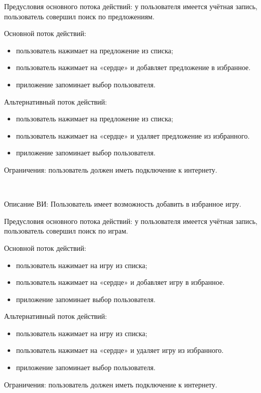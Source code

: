 Предусловия основного потока действий: у пользователя имеется учётная запись, пользователь совершил поиск по предложениям.
 
Основной поток действий:
\begin{itemize}
   \item пользователь нажимает на предложение из списка;
   \item пользователь нажимает на «сердце» и добавляет предложение в избранное.
   \item приложение запоминает выбор пользователя.
\end{itemize}

Альтернативный поток действий:
\begin{itemize}
   \item пользователь нажимает на предложение из списка;
   \item пользователь нажимает на «сердце» и удаляет предложение из избранного.
   \item приложение запоминает выбор пользователя.
\end{itemize}

Ограничения: пользователь должен иметь подключение к интернету.

~\par
\label{use:favoritegames}
Описание ВИ: Пользователь имеет возможность добавить в избранное игру.
 
Предусловия основного потока действий: у пользователя имеется учётная запись, пользователь совершил поиск по играм.
 
Основной поток действий:
\begin{itemize}
   \item пользователь нажимает на игру из списка;
   \item пользователь нажимает на «сердце» и добавляет игру в избранное.
   \item приложение запоминает выбор пользователя.
\end{itemize}

Альтернативный поток действий:
\begin{itemize}
   \item пользователь нажимает на игру из списка;
   \item пользователь нажимает на «сердце» и удаляет игру из избранного.
   \item приложение запоминает выбор пользователя.
\end{itemize}

Ограничения: пользователь должен иметь подключение к интернету.

